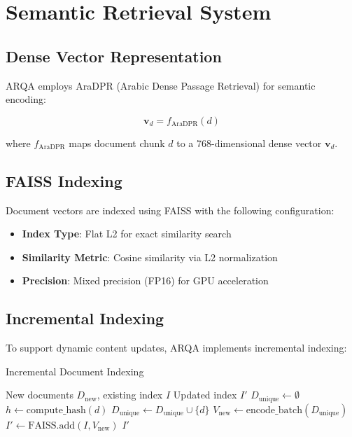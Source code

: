 \documentclass[conference]{IEEEtran}
\begin{document}
\section{Semantic Retrieval System}

\subsection{Dense Vector Representation}
ARQA employs AraDPR (Arabic Dense Passage Retrieval) \cite{b6} for semantic encoding:

$$\mathbf{v}_d = f_{\text{AraDPR}}(d)$$

where $f_{\text{AraDPR}}$ maps document chunk $d$ to a 768-dimensional dense vector $\mathbf{v}_d$.

\subsection{FAISS Indexing}
Document vectors are indexed using FAISS \cite{b9} with the following configuration:
\begin{itemize}
    \item \textbf{Index Type}: Flat L2 for exact similarity search
    \item \textbf{Similarity Metric}: Cosine similarity via L2 normalization
    \item \textbf{Precision}: Mixed precision (FP16) for GPU acceleration
\end{itemize}

\subsection{Incremental Indexing}
To support dynamic content updates, ARQA implements incremental indexing:

\begin{algorithm}
\caption{Incremental Document Indexing}
\begin{algorithmic}[1]
\REQUIRE New documents $D_{\text{new}}$, existing index $I$
\ENSURE Updated index $I'$
\STATE $D_{\text{unique}} \leftarrow \emptyset$
    \STATE $h \leftarrow \text{compute\_hash}(d)$
        \STATE $D_{\text{unique}} \leftarrow D_{\text{unique}} \cup \{d\}$
    \ENDIF
\ENDFOR
\STATE $V_{\text{new}} \leftarrow \text{encode\_batch}(D_{\text{unique}})$
\STATE $I' \leftarrow \text{FAISS.add}(I, V_{\text{new}})$
\RETURN $I'$
\end{algorithmic}
\end{algorithm}
\end{document}
